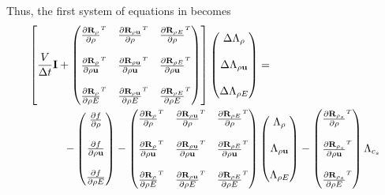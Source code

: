Thus, the first system of equations in  becomes
\begin{equation}
  \begin{split}
    \left[
      \frac{V}{\Delta t} \mi +
      \begin{pmatrix}
        \rtdiff{\rho}{\rho} & \rtdiff{\rho \vu}{\rho} & \rtdiff{\rho E}{\rho} \\ \\
        \rtdiff{\rho}{\rho \vu} & \rtdiff{\rho \vu}{\rho \vu} & \rtdiff{\rho E}{\rho \vu} \\ \\
        \rtdiff{\rho}{\rho E} & \rtdiff{\rho \vu}{\rho E} & \rtdiff{\rho E}{\rho E}
      \end{pmatrix}
    \right]
    \begin{pmatrix}
      \Delta \adjlam{\rho} \\ \\
      \Delta \adjlam{\rho \vu} \\ \\
      \Delta \adjlam{\rho E}
    \end{pmatrix}
    &= \\ -
    \begin{pmatrix}
      \pd{f}{\rho} \\ \\
      \pd{f}{\rho \vu} \\ \\
      \pd{f}{\rho E}
    \end{pmatrix}
    -
    \begin{pmatrix}
      \rtdiff{\rho}{\rho} & \rtdiff{\rho \vu}{\rho} & \rtdiff{\rho E}{\rho} \\ \\
      \rtdiff{\rho}{\rho \vu} & \rtdiff{\rho \vu}{\rho \vu} & \rtdiff{\rho E}{\rho \vu} \\ \\
      \rtdiff{\rho}{\rho E} & \rtdiff{\rho \vu}{\rho E} & \rtdiff{\rho E}{\rho E}
    \end{pmatrix}
    &
    \begin{pmatrix}
      \adjlam{\rho} \\ \\
      \adjlam{\rho \vu} \\ \\
      \adjlam{\rho E}
    \end{pmatrix}
    -
    \begin{pmatrix}
      \rtdiff{\rho_s}{\rho} \\ \\
      \rtdiff{\rho_s}{\rho \vu} \\ \\
      \rtdiff{\rho_s}{\rho E}
    \end{pmatrix}
    \adjlam{c_s}
  \end{split}
  \label{adj-dc-time1}
\end{equation}
